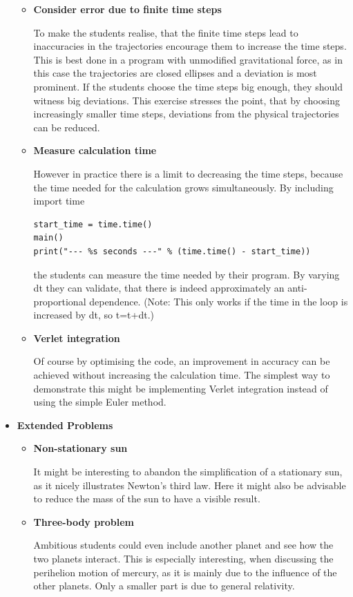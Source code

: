 \documentclass[12pt]{iopart}
\begin{document}
\begin{itemize}
\begin{itemize}
\item \textbf{Consider error due to finite time steps}

To make the students realise, that the finite time steps lead to inaccuracies in the trajectories encourage them to increase the time steps. This is best done in a program with unmodified gravitational force, as in this case the trajectories are closed ellipses and a deviation is most prominent. If the students choose the time steps big enough, they should witness big deviations. This exercise stresses the point, that by choosing increasingly smaller time steps, deviations from the physical trajectories can be reduced.
\item \textbf{Measure calculation time}

However in practice there is a limit to decreasing the time steps, because the time needed for the calculation grows simultaneously. By including
import time
\begin{lstlisting}
start_time = time.time()
main()
print("--- %s seconds ---" % (time.time() - start_time))
\end{lstlisting}
the students can measure the time needed by their program. By varying dt they can validate, that there is indeed approximately an anti-proportional dependence. (Note: This only works if the time in the loop is increased by dt, so t=t+dt.)
\item \textbf{Verlet integration}

Of course by optimising the code, an improvement in accuracy can be achieved without increasing the calculation time. The simplest way to demonstrate this might be implementing Verlet integration instead of using the simple Euler method.
\end{itemize}

\item \textbf{Extended Problems}

\begin{itemize}
\item \textbf{Non-stationary sun}

It might be interesting to abandon the simplification of a stationary sun, as it nicely illustrates Newton's third law. Here it might also be advisable to reduce the mass of the sun to have a visible result.

\item \textbf{Three-body problem}

Ambitious students could even include another planet and see how the two planets interact. This is especially interesting, when discussing the perihelion motion of mercury, as it is mainly due to the influence of the other planets. Only a smaller part is due to general relativity.

\end{itemize}

\end{itemize}
\end{document}
